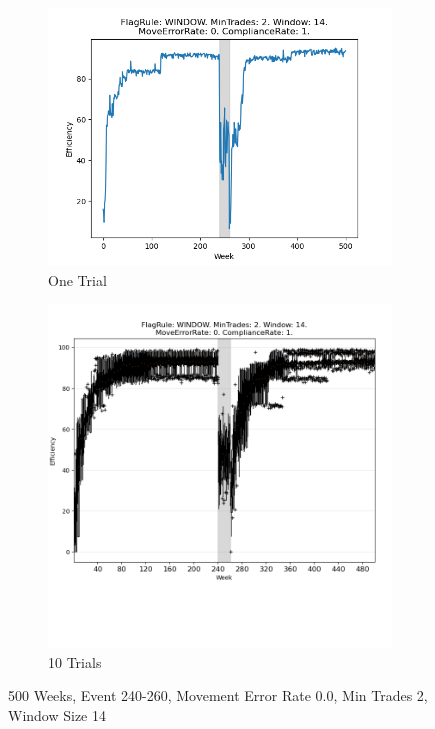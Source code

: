 \documentclass{article}%
\begin{document}
%


\begin{figure}[!htb]%
\begin{subfigure}[b]{0.45\linewidth}%
\includegraphics[width=\linewidth]{2053fr_WINDOW_mt_2_ws_14_er_0_cr_1_t1.png}%
\caption{One Trial}%
\end{subfigure}%
\begin{subfigure}[b]{0.45\linewidth}%
\includegraphics[clip,width=\linewidth,trim=0 4cm 0 0]{2053fr_WINDOW_mt_2_ws_14_er_0_cr_1_t10.png}%
\caption{10 Trials}%
\end{subfigure}%
\caption{500 Weeks, Event 240{-}260, Movement Error Rate 0.0, Min Trades 2, Window Size 14}%
\end{figure}
\end{document}
